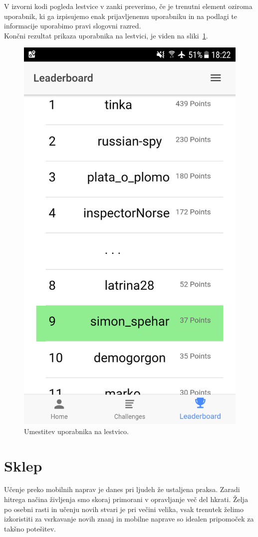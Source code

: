 \documentclass[a4paper, 12pt]{book}
\begin{document}
V izvorni kodi pogleda lestvice v zanki preverimo, če je trenutni element oziroma uporabnik, ki ga izpisujemo enak prijavljenemu uporabniku in na podlagi te informacije uporabimo pravi slogovni razred.\\Končni rezultat prikaza uporabnika na lestvici, je viden na sliki~\ref{leaderboard}.
\begin{figure}[H]
\centering
\includegraphics[height=0.9\textwidth]{slike/leaderboard}
\caption{Umestitev uporabnika na lestvico.}\label{leaderboard}
\end{figure}

\chapter{Sklep}
\label{ch8}
Učenje preko mobilnih naprav je danes pri ljudeh že ustaljena praksa. Zaradi hitrega načina življenja smo skoraj primorani v opravljanje več del hkrati. Želja po osebni rasti in učenju novih stvari je pri večini velika, vsak trenutek želimo izkoristiti za vsrkavanje novih znanj in mobilne naprave so idealen pripomoček za takšno potešitev. 
\end{document}

